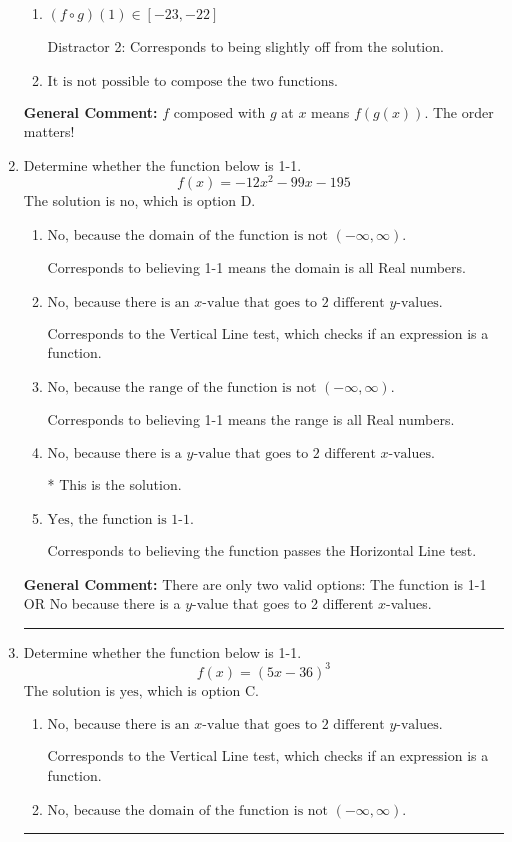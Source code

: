 \documentclass{extbook}[14pt]
\newcommand{\litem}[1]{\item #1

\rule{\textwidth}{0.4pt}}
\begin{document}
\begin{enumerate}
{\begin{enumerate}[label=\Alph*.]
 Distractor 1: Corresponds to reversing the composition.
\item \( (f \circ g)(1) \in [-23, -22] \)

 Distractor 2: Corresponds to being slightly off from the solution.
\item \( \text{It is not possible to compose the two functions.} \)


\end{enumerate}

\textbf{General Comment:} $f$ composed with $g$ at $x$ means $f(g(x))$. The order matters!
}
\litem{
Determine whether the function below is 1-1.
\[ f(x) = -12 x^2 - 99 x - 195 \]The solution is \( \text{no} \), which is option D.\begin{enumerate}[label=\Alph*.]
\item \( \text{No, because the domain of the function is not $(-\infty, \infty)$.} \)

Corresponds to believing 1-1 means the domain is all Real numbers.
\item \( \text{No, because there is an $x$-value that goes to 2 different $y$-values.} \)

Corresponds to the Vertical Line test, which checks if an expression is a function.
\item \( \text{No, because the range of the function is not $(-\infty, \infty)$.} \)

Corresponds to believing 1-1 means the range is all Real numbers.
\item \( \text{No, because there is a $y$-value that goes to 2 different $x$-values.} \)

* This is the solution.
\item \( \text{Yes, the function is 1-1.} \)

Corresponds to believing the function passes the Horizontal Line test.
\end{enumerate}

\textbf{General Comment:} There are only two valid options: The function is 1-1 OR No because there is a $y$-value that goes to 2 different $x$-values.
}
\litem{
Determine whether the function below is 1-1.
\[ f(x) = (5 x - 36)^3 \]The solution is \( \text{yes} \), which is option C.\begin{enumerate}[label=\Alph*.]
\item \( \text{No, because there is an $x$-value that goes to 2 different $y$-values.} \)

Corresponds to the Vertical Line test, which checks if an expression is a function.
\item \( \text{No, because the domain of the function is not $(-\infty, \infty)$.} \)


\end{enumerate}}
\end{enumerate}
\end{document}
